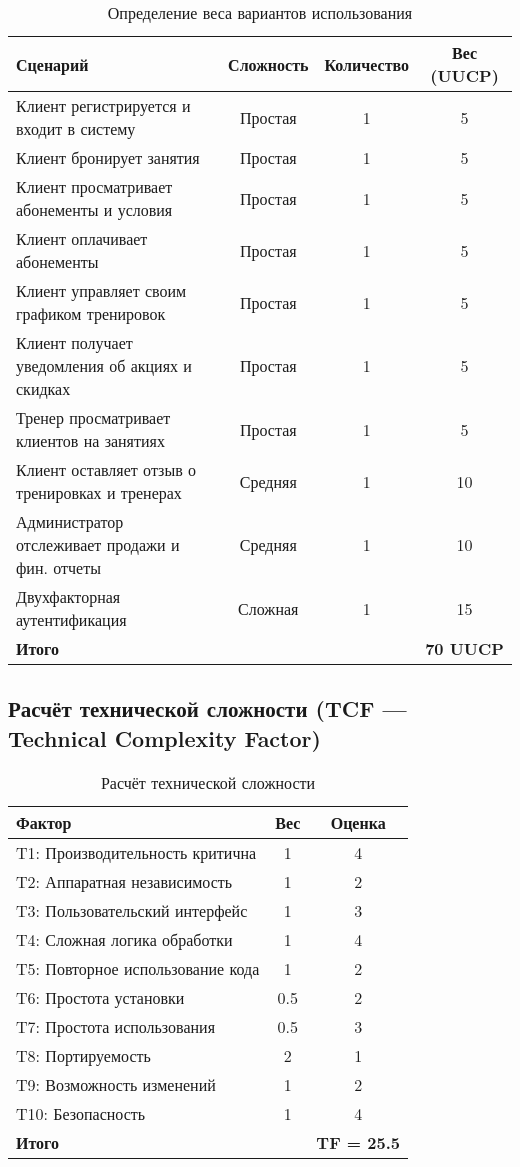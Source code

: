 \documentclass[14pt, russian]{matmex-diploma-custom}
\begin{document}
\begin{table}[H]
    \centering
    \begin{tabular}{|p{7cm}|c|c|c|}
        \hline
        \textbf{Сценарий} & \textbf{Сложность} & \textbf{Количество} & \textbf{Вес (UUCP)} \\
        \hline
        Клиент регистрируется и входит в систему & Простая & 1 & 5 \\
        Клиент бронирует занятия & Простая & 1 & 5 \\
        Клиент просматривает абонементы и условия & Простая & 1 & 5 \\
        Клиент оплачивает абонементы & Простая & 1 & 5 \\
        Клиент управляет своим графиком тренировок & Простая & 1 & 5 \\
        Клиент получает уведомления об акциях и скидках & Простая & 1 & 5 \\
        Тренер просматривает клиентов на занятиях & Простая & 1 & 5 \\
        \hline
        Клиент оставляет отзыв о тренировках и тренерах & Средняя & 1 & 10 \\
        Администратор отслеживает продажи и фин. отчеты & Средняя & 1 & 10 \\
        \hline
        Двухфакторная аутентификация & Сложная & 1 & 15 \\
        \hline
        \textbf{Итого} & & & \textbf{70 UUCP} \\
        \hline
    \end{tabular}
    \caption{Определение веса вариантов использования}
\end{table}


\subsection{Расчёт технической сложности (TCF — Technical Complexity Factor)}

\begin{table}[H]
    \centering
    \begin{tabular}{|p{6.5cm}|c|c|}
    \hline
    Фактор & Вес & Оценка \\
    \hline
    T1: Производительность критична & 1 & 4 \\
    T2: Аппаратная независимость & 1 & 2 \\
    T3: Пользовательский интерфейс & 1 & 3 \\
    T4: Сложная логика обработки & 1 & 4 \\
    T5: Повторное использование кода & 1 & 2 \\
    T6: Простота установки & 0.5 & 2 \\
    T7: Простота использования & 0.5 & 3 \\
    T8: Портируемость & 2 & 1 \\
    T9: Возможность изменений & 1 & 2 \\
    T10: Безопасность & 1 & 4 \\
    \hline
    \textbf{Итого} & & \textbf{TF = 25.5} \\
    \hline
    \end{tabular}
    \caption{Расчёт технической сложности}
\end{table}
\end{document}
